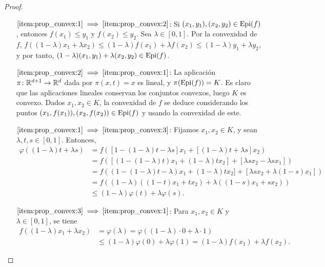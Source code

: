 \begin{proof}~
    \begin{enumerate}[align=left]
        \item[$\ref{item:prop_convex:1} \implies \ref{item:prop_convex:2}$:] Si $(x_1,y_1), (x_2,y_2) \in \operatorname{Epi}(f)$, entonces $f(x_1) \le y_1$ y $f(x_2) \le y_2$. Sea $\lambda \in [0,1]$. Por la convexidad de $f$, $f((1-\lambda)x_1 + \lambda x_2) \le (1-\lambda)f(x_1) + \lambda f(x_2) \le (1-\lambda)y_1 + \lambda y_2$, y por tanto, $(1-\lambda)(x_1,y_1) + \lambda(x_2,y_2) \in \operatorname{Epi}(f)$.
        \item[$\ref{item:prop_convex:2} \implies \ref{item:prop_convex:1}$:] La aplicación $\pi \colon \mathbb{R}^{d+1} \to \mathbb{R}^d$ dada por $\pi(x,t) = x$ es lineal, y $\pi(\operatorname{Epi}(f)) = K$. Es claro que las aplicaciones lineales conservan los conjuntos convexos, luego $K$ es convexo. Dados $x_1,x_2 \in K$, la convexidad de $f$ se deduce considerando los puntos $(x_1,f(x_1)),(x_2,f(x_2)) \in \operatorname{Epi}(f)$ y usando la convexidad de este.
        \item[$\ref{item:prop_convex:1} \implies \ref{item:prop_convex:3}$:] Fijamos $x_1,x_2 \in K$, y sean $\lambda,t,s\in [0,1]$. Entonces,
        \begin{align*}
            \varphi((1-\lambda)t + \lambda s) &= f([1-(1-\lambda)t - \lambda s]x_1 + [(1-\lambda)t + \lambda s]x_2 ) \\
                                           &= f([(1-(1-\lambda)t) x_1 + (1-\lambda)tx_2] + [\lambda s x_2 - \lambda s x_1] ) \\
                                           &= f((1-(1-\lambda)t - \lambda) x_1 + (1-\lambda)tx_2] + [\lambda s x_2 +\lambda(1- s) x_1]) \\
                                           &= f((1-\lambda)((1-t)x_1 + tx_2) + \lambda((1-s)x_1 + sx_2)) \\
                                           &\le (1-\lambda)\varphi(t) + \lambda\varphi(s).
        \end{align*}
        \item[$\ref{item:prop_convex:3} \implies \ref{item:prop_convex:1}$:] Para $x_1,x_2 \in K$ y $\lambda \in [0,1]$, se tiene
        \begin{align*}
            f((1-\lambda)x_1 + \lambda x_2) &= \varphi(\lambda) = \varphi((1-\lambda) \cdot 0 + \lambda \cdot 1) \\
                                            &\le (1-\lambda) \varphi(0) + \lambda\varphi(1) = (1-\lambda)f(x_1) + \lambda f(x_2). 
        \end{align*}
    \end{enumerate}
\end{proof}

